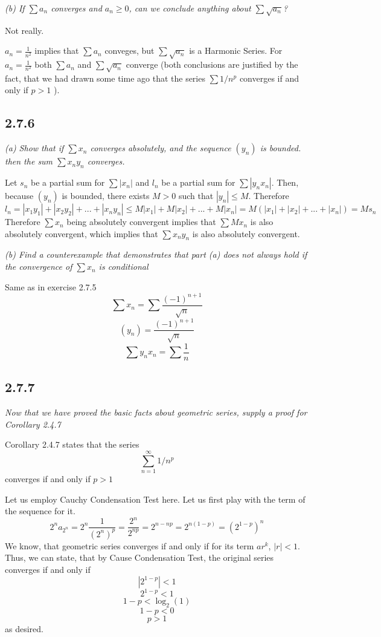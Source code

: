 \documentclass[11pt,oneside,titlepage]{book}
\begin{document}
\textit{(b) If $\sum a_n$ converges and $a_n \geq 0$, can we conclude anything
  about $\sum \sqrt{a_n}$?}

Not really.

$a_n = \frac{1}{n^2}$ implies that  $\sum a_n $ conveges, but $\sum \sqrt{a_n}$
is a Harmonic Series. For $a_n = \frac{1}{n^2}$ both $\sum a_n$ and
$\sum \sqrt{a_n}$ converge (both conclusions are justified by the fact, that
we had drawn  some time ago that the series
$\sum 1/n^p$ converges if and only if $p > 1$ ).

\subsection*{2.7.6}
\textit{(a) Show that if $\sum x_n$ converges absolutely, and the sequence
$(y_n)$ is bounded. then the sum $\sum x_n y_n$ converges.}


Let $s_n$ be a partial sum for $\sum |x_n|$ and $l_n$ be a partial sum
for $\sum |y_n x_n|$. Then, because $(y_n)$
is bounded, there exists $M > 0$ such that $|y_n| \leq M$.  Therefore
$$l_n = |x_1 y_1| + |x_2 y_2| + ... + |x_n y_n| \leq M|x_1| + M|x_2| + ... +
M|x_n| = M(|x_1| + |x_2| + ... + |x_n|) = Ms_n$$
Therefore $\sum x_n$  being absolutely  convergent implies that
$\sum M x_n$ is also absolutely convergent, which implies that $\sum x_n y_n$
is also absolutely convergent.

\textit{(b) Find a counterexample that demonstrates that part (a) does not
  always hold if the convergence of $\sum x_n$ is conditional}

Same as in exercise 2.7.5
$$\sum x_n = \sum \frac{(-1)^{n + 1}}{\sqrt{n}}$$
$$(y_n) = \frac{(-1)^{n + 1}}{\sqrt{n}}$$
$$\sum y_n x_n = \sum \frac{1}{n}$$

\subsection*{2.7.7}
\textit{Now that we have proved the basic facts about geometric series,
  supply a proof for Corollary 2.4.7}

Corollary 2.4.7 states that the series
$$\sum^{\infty}_{n = 1} 1/n^p$$
converges if and only if $p > 1$



Let us employ Cauchy Condensation Test here.
Let us first play with the term of the sequence for it.
$$2^n a_{2^n} = 2^n \frac{1}{(2^n)^p} = \frac{2^n}{2^{np}} =
2^{n - np} = 2^{n(1 - p)} = (2^{1 - p})^n$$
We know, that geometric series converges if and only if
for its term $ar^k$,  $|r| < 1$. Thus, we
can state, that by Cause Condensation Test, the original series converges
if and only if 
$$|2^{1 - p}| < 1$$
$$2^{1 - p} < 1$$
$$1 - p < \log_2 (1)$$
$$1 - p < 0$$
$$p > 1$$
as desired.
\end{document}

